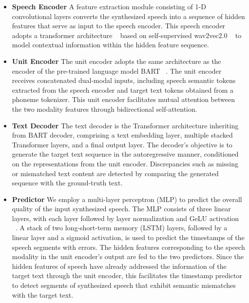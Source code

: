 \documentclass[letterpaper]{article} %
\begin{document}
\begin{itemize}
\item \textbf{Speech Encoder}
A feature extraction module consisting of 1-D convolutional layers converts the synthesized speech into a sequence of hidden features that serve as input to the speech encoder. This speech encoder adopts a transformer architecture ~\cite{vaswani2017attention} based on self-supervised wav2vec2.0 ~\cite{baevski2020wav2vec} to model contextual information within the hidden feature sequence. 

\item \textbf {Unit Encoder}
The unit encoder adopts the same architecture as the encoder of the pre-trained language model BART ~\cite{lewis2019bart}. The unit encoder receives concatenated dual-modal inputs, including speech semantic tokens extracted from the speech encoder and target text tokens obtained from a phoneme tokenizer. This unit encoder facilitates mutual attention between the two modality features through bidirectional self-attention.

\item \textbf {Text Decoder}
The text decoder is the Transformer architecture inheriting from BART decoder, comprising a text embedding layer, multiple stacked Transformer layers, and a final output layer. The decoder's objective is to generate the target text sequence in the autoregressive manner, conditioned on the representations from the unit encoder. Discrepancies such as missing or mismatched text content are detected by comparing the generated sequence with the ground-truth text.

\item \textbf {Predictor}
We employ a multi-layer perceptron (MLP) to predict the overall quality of the input synthesized speech. The MLP consists of three linear layers, with each layer followed by layer normalization and GeLU activation ~\cite{hendrycks2016gaussian}. A stack of two long-short-term memory (LSTM) layers, followed by a linear layer and a sigmoid activation, is used to predict the timestamps of the speech segments with errors. The hidden features corresponding to the speech modality in the unit encoder's output are fed to the two predictors. Since the hidden features of speech have already addressed the information of the target text through the unit encoder, this facilitates the timestamp predictor to detect segments of synthesized speech that exhibit semantic mismatches with the target text.

\end{itemize}
\end{document}
